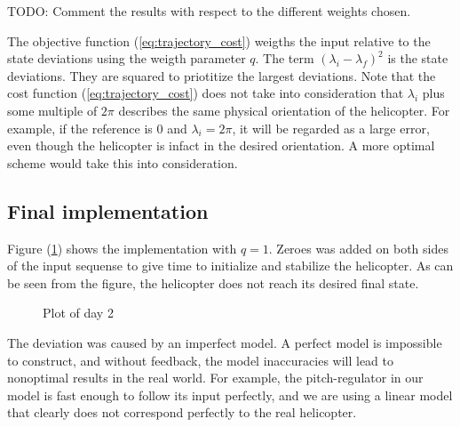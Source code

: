 TODO: Comment the results with respect to the different weights chosen.



The objective function (\ref{eq:trajectory_cost}) weigths the input relative to the state deviations using the weigth parameter $q$. The term $(\lambda_i - \lambda_f)^2$ is the state deviations. They are squared to priotitize the largest deviations. Note that the cost function (\ref{eq:trajectory_cost}) does not take into consideration that $\lambda_i$ plus some multiple of $2\pi$ describes the same physical orientation of the helicopter. For example, if the reference is $0$ and $\lambda_i = 2\pi$, it will be regarded as a large error, even though the helicopter is infact in the desired orientation. A more optimal scheme would take this into consideration.


\subsection{Final implementation}

Figure (\ref{fig:day2_plot}) shows the implementation with $q = 1$. Zeroes was added on both sides of the input sequense to give time to initialize and stabilize the helicopter. As can be seen from the figure, the helicopter does not reach its desired final state. 

\begin{figure}[htb]
	\centering
	\caption{Plot of day 2}
	\label{fig:day2_plot}
\end{figure}

The deviation was caused by an imperfect model. A perfect model is impossible to construct, and without feedback, the model inaccuracies will lead to nonoptimal results in the real world. For example, the pitch-regulator in our model is fast enough to follow its input perfectly, and we are using a linear model that clearly does not correspond perfectly to the real helicopter.